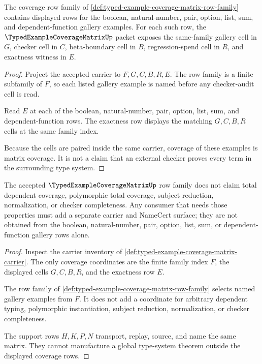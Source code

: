 \begin{theorem}
\label{thm:typed-example-coverage-matrix-gallery-rows}
The coverage row family of \autoref{def:typed-example-coverage-matrix-row-family} contains displayed rows for the boolean, natural-number, pair, option, list, sum, and dependent-function gallery examples. For each such row, the $\TypedExampleCoverageMatrixUp$ packet exposes the same-family gallery cell in $G$, checker cell in $C$, beta-boundary cell in $B$, regression-spend cell in $R$, and exactness witness in $E$.
\end{theorem}
\begin{proof}
Project the accepted carrier to $F,G,C,B,R,E$. The row family is a finite subfamily of $F$, so each listed gallery example is named before any checker-audit cell is read.

Read $E$ at each of the boolean, natural-number, pair, option, list, sum, and dependent-function rows. The exactness row displays the matching $G,C,B,R$ cells at the same family index.

Because the cells are paired inside the same carrier, coverage of these examples is matrix coverage. It is not a claim that an external checker proves every term in the surrounding type system.
\end{proof}

\begin{theorem}
\label{thm:typed-example-coverage-matrix-boundary-rows}
The accepted $\TypedExampleCoverageMatrixUp$ row family does not claim total dependent coverage, polymorphic total coverage, subject reduction, normalization, or checker completeness. Any consumer that needs those properties must add a separate carrier and NameCert surface; they are not obtained from the boolean, natural-number, pair, option, list, sum, or dependent-function gallery rows alone.
\end{theorem}
\begin{proof}
Inspect the carrier inventory of \autoref{def:typed-example-coverage-matrix-carrier}. The only coverage coordinates are the finite family index $F$, the displayed cells $G,C,B,R$, and the exactness row $E$.

The row family of \autoref{def:typed-example-coverage-matrix-row-family} selects named gallery examples from $F$. It does not add a coordinate for arbitrary dependent typing, polymorphic instantiation, subject reduction, normalization, or checker completeness.

The support rows $H,K,P,N$ transport, replay, source, and name the same matrix. They cannot manufacture a global type-system theorem outside the displayed coverage rows.
\end{proof}

